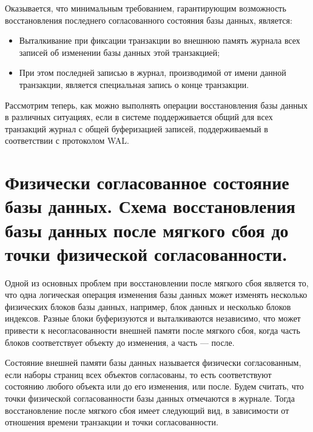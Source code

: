 \documentclass[a4paper,12pt]{article}
\begin{document}
Оказывается, что минимальным требованием, гарантирующим возможность восстановления последнего согласованного состояния базы данных, является:
\begin{itemize}
    \item Выталкивание при фиксации транзакции во внешнюю память журнала всех записей об изменении базы данных этой транзакцией;
    \item При этом последней записью в журнал, производимой от имени данной транзакции, является специальная запись о конце транзакции.
\end{itemize}

Рассмотрим теперь, как можно выполнять операции восстановления базы данных в различных ситуациях, если в системе поддерживается общий для всех транзакций журнал с общей буферизацией записей, поддерживаемый в соответствии с протоколом WAL.

\section{Физически согласованное состояние базы данных. Схема восстановления базы данных после мягкого сбоя до точки физической согласованности.}

Одной из основных проблем при восстановлении после мягкого сбоя является то, что одна логическая операция изменения базы данных может изменять несколько физических блоков базы данных, например, блок данных и несколько блоков индексов. Разные блоки буферизуются и выталкиваются независимо, что может привести к несогласованности внешней памяти после мягкого сбоя, когда часть блоков соответствует объекту до изменения, а часть --- после.

Состояние внешней памяти базы данных называется физически согласованным, если наборы страниц всех объектов согласованы, то есть соответствуют состоянию любого объекта или до его изменения, или после. Будем считать, что точки физической согласованности базы данных отмечаются в журнале. Тогда восстановление после мягкого сбоя имеет следующий вид, в зависимости от отношения времени транзакции и точки согласованности.
\end{document}
